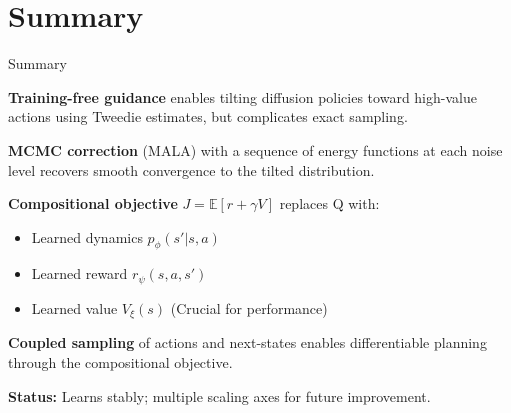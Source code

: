 \documentclass[aspectratio=169]{beamer}
\begin{document}
\section{Summary}

\begin{frame}{Summary}

\textbf{Training-free guidance} enables tilting diffusion policies toward high-value actions using Tweedie estimates, but complicates exact sampling.

\vspace{0.5em}
\textbf{MCMC correction} (MALA) with a sequence of energy functions at each noise level recovers smooth convergence to the tilted distribution.

\vspace{0.5em}
\textbf{Compositional objective} $J = \mathbb{E}[r + \gamma V]$ replaces Q with:
\begin{itemize}
    \item Learned dynamics $p_\phi(s'|s,a)$
    \item Learned reward $r_\psi(s,a,s')$
    \item Learned value $V_\xi(s)$ (Crucial for performance)
\end{itemize}

\vspace{0.5em}
\textbf{Coupled sampling} of actions and next-states enables differentiable planning through the compositional objective.

\vspace{0.5em}
\textbf{Status:} Learns stably; multiple scaling axes for future improvement.

\end{frame}

\appendix
\end{document}
